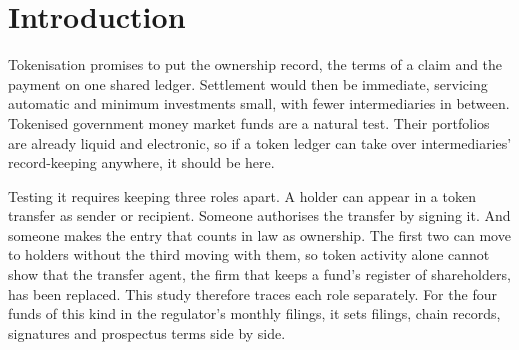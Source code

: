 \documentclass[12pt,a4paper]{article}
\begin{document}
\begin{abstract}
For South Africa, I recommend reading existing law technology-neutrally, running a conditional pilot and narrowly clarifying draft exchange-control rules that would also treat a fund unit as a crypto asset. A security-token definition would not settle what matters: which record governs and who writes it. The evidence is descriptive.
\end{abstract}

\newpage
\begin{singlespace}
\tableofcontents
\end{singlespace}
\newpage

\section{Introduction}\label{sec:intro}
Tokenisation promises to put the ownership record, the terms of a claim and the payment on one shared ledger. Settlement would then be immediate, servicing automatic and minimum investments small, with fewer intermediaries in between. Tokenised government money market funds are a natural test. Their portfolios are already liquid and electronic, so if a token ledger can take over intermediaries' record-keeping anywhere, it should be here.

Testing it requires keeping three roles apart. A holder can appear in a token transfer as sender or recipient. Someone authorises the transfer by signing it. And someone makes the entry that counts in law as ownership. The first two can move to holders without the third moving with them, so token activity alone cannot show that the transfer agent, the firm that keeps a fund's register of shareholders, has been replaced. This study therefore traces each role separately. For the four funds of this kind in the regulator's monthly filings, it sets filings, chain records, signatures and prospectus terms side by side.
\end{document}

